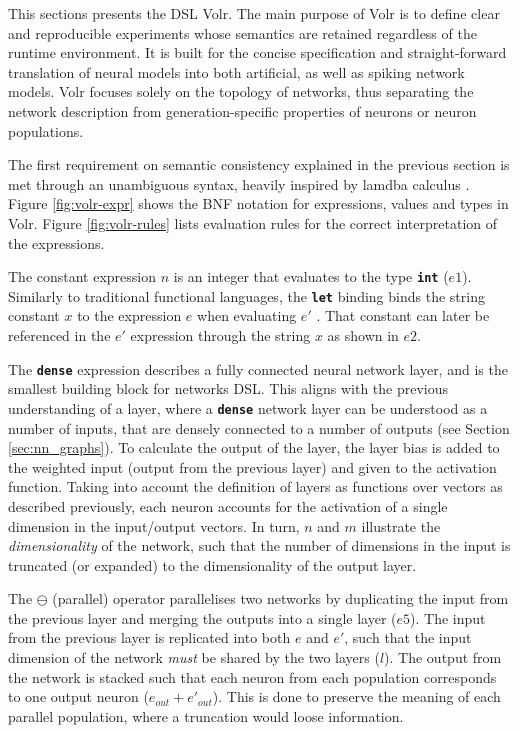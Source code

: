 This sections presents the \gls{DSL} Volr. 
The main purpose of Volr is to define clear and reproducible
experiments whose semantics are retained regardless of
the runtime environment.
It is built for the concise specification and straight-forward
translation of neural models into both artificial, as well as
spiking network models.
Volr focuses solely on the topology of networks, thus
separating the network description from generation-specific
properties of neurons or neuron populations.

The first requirement on semantic consistency explained in the previous section is met through an unambiguous
syntax, heavily inspired by lamdba calculus \cite{Pierce2002}.
Figure \ref{fig:volr-expr} shows the BNF notation for expressions, values and types
in Volr. 
Figure \ref{fig:volr-rules} lists evaluation rules for the correct
interpretation of the expressions.




The constant expression $n$ is an integer that evaluates to the type 
\texttt{\textbf{int}} ($e1$). 
Similarly to traditional functional languages, the \texttt{\textbf{let}} binding binds
the string constant $x$ to the expression $e$ when evaluating $e'$ \cite{Pierce2002}.
That constant can later be referenced in the $e'$ expression 
through the string $x$ as shown in $e2$.

The \texttt{\textbf{dense}} expression describes a fully connected
neural network layer, and is the smallest building block for networks
\gls{DSL}.
This aligns with the previous understanding of a layer, where
a \texttt{\textbf{dense}} network layer can be understood as a number of inputs,
that are densely connected to a number of outputs (see Section
\ref{sec:nn_graphs}).
To calculate the output of the layer, the layer bias is added to the
weighted input (output from the previous layer) and given 
to the activation function.
Taking into account the definition of layers as functions over vectors as described previously, each neuron 
accounts for the activation of a single dimension in the input/output vectors.
In turn, $n$ and $m$ illustrate the \textit{dimensionality} of the network,
such that the number of dimensions in the input is truncated (or expanded) to
the dimensionality of the output layer.

The $\ominus$ (parallel) operator parallelises two networks by duplicating
the input from the previous layer and merging the outputs into a single
layer ($e5$).
The input from the previous layer is replicated into both $e$ and $e'$, such
that the input dimension of the network \textit{must} be shared by the two layers ($l$).
The output from the network is stacked such that each neuron from each
population corresponds to one output neuron ($e_{out} + e'_{out}$).
This is done to preserve the meaning of each parallel population, where
a truncation would loose information.

